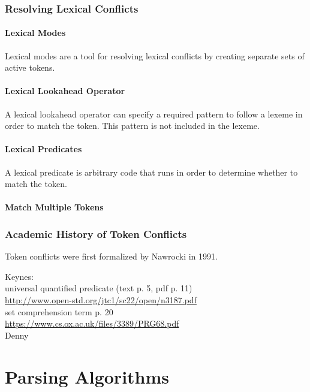 \documentclass{book}
\begin{document}
\subsection{Resolving Lexical Conflicts}
\subsubsection{Lexical Modes}
Lexical modes are a tool for resolving lexical conflicts
by creating separate sets of active tokens.

\subsubsection{Lexical Lookahead Operator}
A lexical lookahead operator can specify a required
pattern to follow a lexeme in order to match the token.
This pattern is not included in the lexeme.


\subsubsection{Lexical Predicates}
A lexical predicate is arbitrary code that runs in order
to determine whether to match the token.

\subsubsection{Match Multiple Tokens}

\subsection{Academic History of Token Conflicts}

Token conflicts were first formalized by Nawrocki in 1991.


Keynes:\\

universal quantified predicate (text p. 5, pdf p. 11)\\
\url{http://www.open-std.org/jtc1/sc22/open/n3187.pdf}\\

set comprehension term p. 20\\
\url{https://www.cs.ox.ac.uk/files/3389/PRG68.pdf}\\

Denny




%
%
\chapter{Parsing Algorithms}
\end{document}
